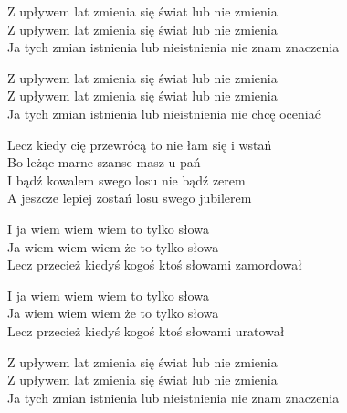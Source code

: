 \begin{text}
    \begin{smallTwo}
    Z upływem lat zmienia się świat lub nie zmienia\\
    Z upływem lat zmienia się świat lub nie zmienia\\
    Ja tych zmian istnienia lub nieistnienia nie znam znaczenia

    Z upływem lat zmienia się świat lub nie zmienia\\
    Z upływem lat zmienia się świat lub nie zmienia\\
    Ja tych zmian istnienia lub nieistnienia nie chcę oceniać

    Lecz kiedy cię przewrócą to nie łam się i wstań\\
    Bo leżąc marne szanse masz u pań\\
    I bądź kowalem swego losu nie bądź zerem\\
    A jeszcze lepiej zostań losu swego jubilerem

    I ja wiem wiem wiem to tylko słowa\\
    Ja wiem wiem wiem że to tylko słowa\\
    Lecz przecież kiedyś kogoś ktoś słowami zamordował

    I ja wiem wiem wiem to tylko słowa\\
    Ja wiem wiem wiem że to tylko słowa\\
    Lecz przecież kiedyś kogoś ktoś słowami uratował

    Z upływem lat zmienia się świat lub nie zmienia\\
    Z upływem lat zmienia się świat lub nie zmienia\\
    Ja tych zmian istnienia lub nieistnienia nie znam znaczenia
\end{smallTwo}
\end{text}
\begin{chord}

\end{chord}